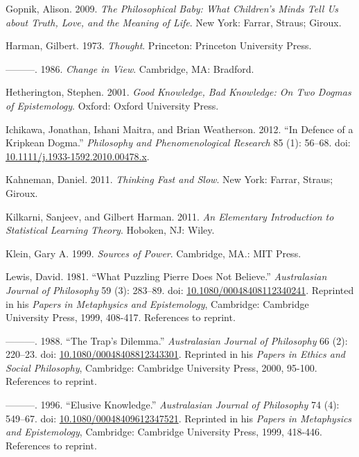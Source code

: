 \documentclass[
  10pt,
  letterpaper,
  DIV=11,
  numbers=noendperiod,
  twoside]{scrartcl}
\newlength{\cslhangindent}
\newenvironment{CSLReferences}[2] %
 {\begin{list}{}{%
  \setlength{\itemindent}{0pt}
  \setlength{\leftmargin}{0pt}
  \setlength{\parsep}{0pt}
  \ifodd #1
   \setlength{\leftmargin}{\cslhangindent}
   \setlength{\itemindent}{-1\cslhangindent}
  \fi
  \setlength{\itemsep}{#2\baselineskip}}}
 {\end{list}}
\begin{document}
\begin{CSLReferences}{1}{0}
Gopnik, Alison. 2009. \emph{The Philosophical Baby: What Children's
Minds Tell Us about Truth, Love, and the Meaning of Life}. New York:
Farrar, Straus; Giroux.

Harman, Gilbert. 1973. \emph{Thought}. Princeton: Princeton University
Press.

---------. 1986. \emph{Change in View}. Cambridge, MA: Bradford.

Hetherington, Stephen. 2001. \emph{Good Knowledge, Bad Knowledge: On Two
Dogmas of Epistemology}. Oxford: Oxford University Press.

Ichikawa, Jonathan, Ishani Maitra, and Brian Weatherson. 2012. {``In
Defence of a Kripkean Dogma.''} \emph{Philosophy and Phenomenological
Research} 85 (1): 56--68. doi:
\href{https://doi.org/10.1111/j.1933-1592.2010.00478.x}{10.1111/j.1933-1592.2010.00478.x}.

Kahneman, Daniel. 2011. \emph{Thinking Fast and Slow}. New York: Farrar,
Straus; Giroux.

Kilkarni, Sanjeev, and Gilbert Harman. 2011. \emph{An Elementary
Introduction to Statistical Learning Theory}. Hoboken, NJ: Wiley.

Klein, Gary A. 1999. \emph{Sources of Power}. Cambridge, MA.: {MIT}
Press.

Lewis, David. 1981. {``What Puzzling {P}ierre Does Not Believe.''}
\emph{Australasian Journal of Philosophy} 59 (3): 283--89. doi:
\href{https://doi.org/10.1080/00048408112340241}{10.1080/00048408112340241}.
Reprinted in his \emph{Papers in Metaphysics and Epistemology},
Cambridge: Cambridge University Press, 1999, 408-417. References to
reprint.

---------. 1988. {``The Trap's Dilemma.''} \emph{Australasian Journal of
Philosophy} 66 (2): 220--23. doi:
\href{https://doi.org/10.1080/00048408812343301}{10.1080/00048408812343301}.
Reprinted in his \emph{Papers in Ethics and Social Philosophy},
Cambridge: Cambridge University Press, 2000, 95-100. References to
reprint.

---------. 1996. {``Elusive Knowledge.''} \emph{Australasian Journal of
Philosophy} 74 (4): 549--67. doi:
\href{https://doi.org/10.1080/00048409612347521}{10.1080/00048409612347521}.
Reprinted in his \emph{Papers in Metaphysics and Epistemology},
Cambridge: Cambridge University Press, 1999, 418-446. References to
reprint.


\end{CSLReferences}
\end{document}
